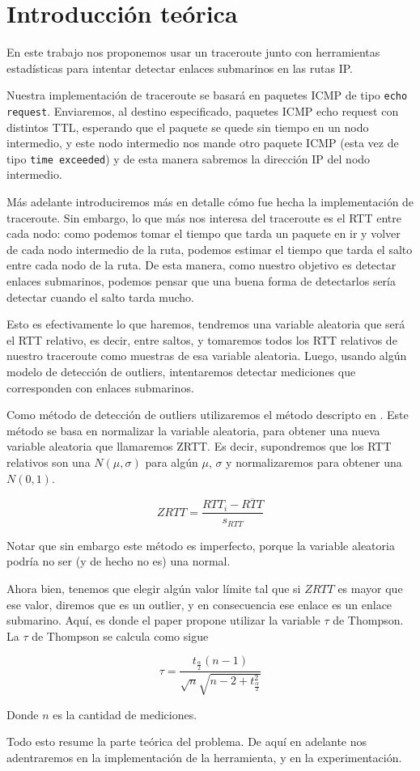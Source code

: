 \section{Introducci\'on te\'orica}

\PARstart En este trabajo nos proponemos usar un traceroute junto con herramientas estadísticas para intentar detectar enlaces submarinos en las rutas IP. 

Nuestra implementación de traceroute se basará en paquetes ICMP de tipo \texttt{echo request}. Enviaremos, al destino especificado, paquetes ICMP echo request con distintos TTL, esperando que el paquete se quede sin tiempo en un nodo intermedio, y este nodo intermedio nos mande otro paquete ICMP (esta vez de tipo \texttt{time exceeded}) y de esta manera sabremos la dirección IP del nodo intermedio.


Más adelante introduciremos más en detalle cómo fue hecha la implementación de traceroute. Sin embargo, lo que más nos interesa del traceroute es el RTT entre cada nodo: como podemos tomar el tiempo que tarda un paquete en ir y volver de cada nodo intermedio de la ruta, podemos estimar el tiempo que tarda el salto entre cada nodo de la ruta. De esta manera, como nuestro objetivo es detectar enlaces submarinos, podemos pensar que una buena forma de detectarlos sería detectar cuando el salto tarda mucho.

Esto es efectivamente lo que haremos, tendremos una variable aleatoria que será el RTT relativo, es decir, entre saltos, y tomaremos todos los RTT relativos de nuestro traceroute como muestras de esa variable aleatoria. Luego, usando algún modelo de detección de outliers, intentaremos detectar mediciones que corresponden con enlaces submarinos.

Como método de detección de outliers utilizaremos el método descripto en \cite{outliers}. Este método se basa en normalizar la variable aleatoria, para obtener una nueva variable aleatoria que llamaremos ZRTT. Es decir, supondremos que los RTT relativos son una $N(\mu, \sigma)$ para algún $\mu$, $\sigma$ y normalizaremos para obtener una $N(0,1)$.

\[
  ZRTT = \frac{RTT_i - \overline{RTT}}{s_{RTT}}
\]

Notar que sin embargo este método es imperfecto, porque la variable aleatoria podría no ser (y de hecho no es) una normal.

Ahora bien, tenemos que elegir algún valor límite tal que si $ZRTT$ es mayor que ese valor, diremos que es un outlier, y en consecuencia ese enlace es un enlace submarino. Aquí, es donde el paper \cite{outliers} propone utilizar la variable $\tau$ de Thompson. La $\tau$ de Thompson se calcula como sigue

\[
  \tau = \frac{
                 t_{\frac{\alpha}{2}} (n-1)
              }{
                 \sqrt{n} \sqrt{n-2 + t_{\frac{\alpha}{2}}^2}
              }
\]

Donde $n$ es la cantidad de mediciones. 

Todo esto resume la parte teórica del problema. De aquí en adelante nos adentraremos en la implementación de la herramienta, y en la experimentación.




